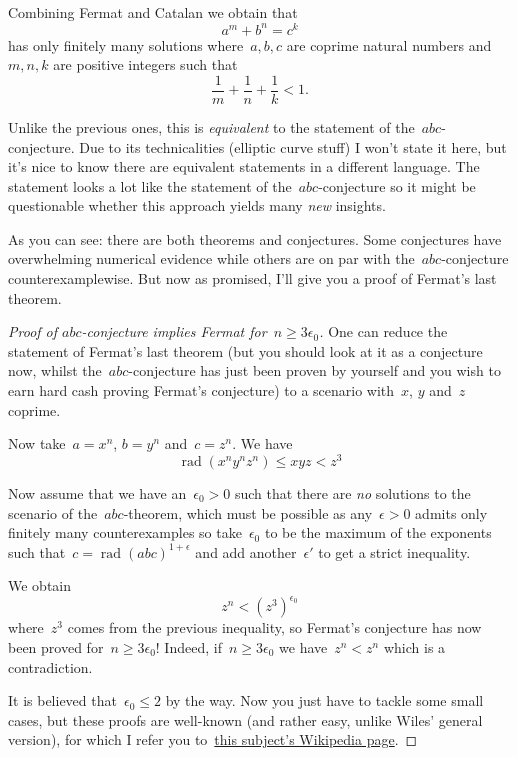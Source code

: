 \documentclass[11pt, a4paper, openany, oneside, article]{memoir}
\theoremstyle{definition}
\DeclareMathOperator\rad{rad}
\begin{document}
\begin{description}
    Combining Fermat and Catalan we obtain that
    \begin{equation}
      a^m+b^n=c^k
    \end{equation}
    has only finitely many solutions where~$a,b,c$ are coprime natural numbers and~$m,n,k$ are positive integers such that
    \begin{equation}
      \frac{1}{m}+\frac{1}{n}+\frac{1}{k}<1.
    \end{equation}

  \item[\textbf{Szpiro's conjecture}] Unlike the previous ones, this is \emph{equivalent} to the statement of the~$abc$-conjecture. Due to its technicalities (elliptic curve stuff) I won't state it here, but it's nice to know there are equivalent statements in a different language. The statement looks a lot like the statement of the~$abc$\nobreakdash-conjecture so it might be questionable whether this approach yields many \emph{new} insights.
\end{description}

As you can see: there are both theorems and conjectures. Some conjectures have overwhelming numerical evidence while others are on par with the~$abc$-conjecture counterexamplewise. But now as promised, I'll give you a proof of Fermat's last theorem.


\begin{proof}[Proof of $abc$-conjecture implies Fermat for~$n\geq3\epsilon_0$]
  One can reduce the statement of Fermat's last theorem (but you should look at it as a conjecture now, whilst the~$abc$\nobreakdash-conjecture has just been proven by yourself and you wish to earn hard cash proving Fermat's conjecture) to a scenario with~$x$, $y$ and~$z$ coprime.
  
  Now take~$a=x^n$, $b=y^n$ and~$c=z^n$. We have
  \begin{equation}
    \rad(x^ny^nz^n)\leq xyz<z^3
  \end{equation}

  Now assume that we have an~$\epsilon_0>0$ such that there are \emph{no} solutions to the scenario of the~$abc$\nobreakdash-theorem, which must be possible as any~$\epsilon>0$ admits only finitely many counterexamples so take~$\epsilon_0$ to be the maximum of the exponents such that~$c=\rad(abc)^{1+\epsilon}$ and add another~$\epsilon'$ to get a strict inequality.
  
  We obtain
  \begin{equation}
    z^n<(z^3)^{\epsilon_0}
  \end{equation}
  where~$z^3$ comes from the previous inequality, so Fermat's conjecture has now been proved for~$n\geq 3\epsilon_0$! Indeed, if~$n\geq 3\epsilon_0$ we have~$z^n<z^n$ which is a contradiction.

  It is believed that~$\epsilon_0\leq 2$ by the way. Now you just have to tackle some small cases, but these proofs are well-known (and rather easy, unlike Wiles' general version), for which I refer you to~\href{http://en.wikipedia.org/wiki/Fermat's_Last_Theorem#Proofs_for_specific_exponents}{this subject's Wikipedia page}.
\end{proof}
\end{document}
